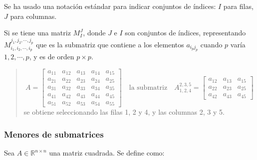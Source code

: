\begin{tcolorbox}[interesting_data, title=Detalle]
  Se ha usado una notación estándar para indicar conjuntos de índices: \(I\) para filas, \(J\) para columnas.
  
  Si se tiene una matriz \(M^J_I\), donde \(J\) e \(I\) son conjuntos de índices, representando \(M^{j_1,j_2,\cdots,j_p}_{i_1,i_2,\cdots,i_p}\) que es la submatriz que contiene a los elementos \(a_{i_p j_p}\) cuando \(p\) varía \(1,2,\cdots,p\), y es de orden \(p\times p\).
\end{tcolorbox}

\begin{quote}
  \[
  A = \begin{bmatrix}
  a_{11} & a_{12} & a_{13} & a_{14} & a_{15} \\
  a_{21} & a_{22} & a_{23} & a_{24} & a_{25} \\
  a_{31} & a_{32} & a_{33} & a_{34} & a_{35} \\
  a_{41} & a_{42} & a_{43} & a_{44} & a_{45} \\
  a_{51} & a_{52} & a_{53} & a_{54} & a_{55}
  \end{bmatrix} \quad \text{la submatriz} \quad
  A^{2,3,5}_{1,2,4} = 
  \begin{bmatrix}
  a_{12} & a_{13} & a_{15} \\
  a_{22} & a_{23} & a_{25} \\
  a_{42} & a_{43} & a_{45}
  \end{bmatrix}
  \]
  se obtiene seleccionando las filas 1, 2 y 4, y las columnas 2, 3 y 5.
\end{quote}

\subsubsection{Menores de submatrices}

Sea \(A \in \mathbb{R}^{n \times n}\) una matriz cuadrada. Se define como:

